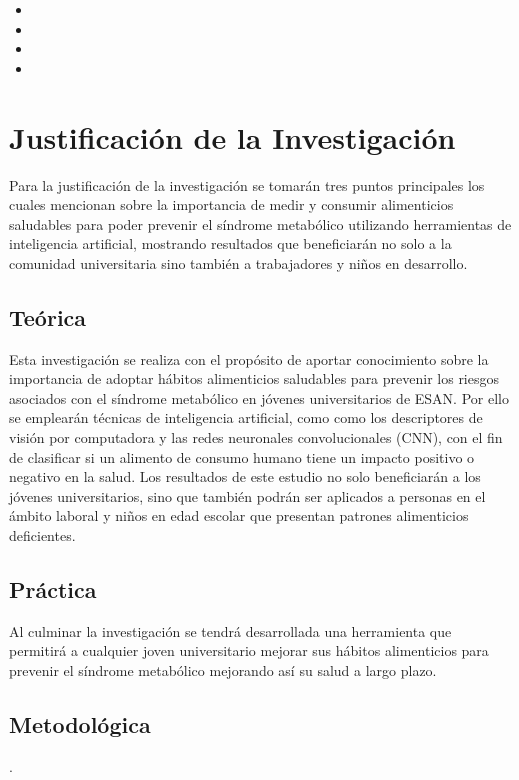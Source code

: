 \begin{itemize}
	\item \Hone
	\item \Htwo
	\item \Hthree
 	\item \Hfour
\end{itemize}

\section{Justificación de la Investigación}

Para la justificación de la investigación se tomarán tres puntos principales los cuales mencionan sobre la importancia de medir y consumir alimenticios saludables para poder prevenir el síndrome metabólico utilizando herramientas de inteligencia artificial, mostrando resultados que beneficiarán no solo a la comunidad universitaria sino también a trabajadores y niños en desarrollo.

\subsection{Teórica}

Esta investigación se realiza con el propósito de aportar conocimiento sobre la importancia de adoptar hábitos alimenticios saludables para prevenir los riesgos asociados con el síndrome metabólico en jóvenes universitarios de ESAN. Por ello se emplearán técnicas de inteligencia artificial, como como los descriptores de visión por computadora y las redes neuronales convolucionales (CNN), con el fin de clasificar si un alimento de consumo humano tiene un impacto positivo o negativo en la salud. Los resultados de este estudio no solo beneficiarán a los jóvenes universitarios, sino que también podrán ser aplicados a personas en el ámbito laboral y niños en edad escolar que presentan patrones alimenticios deficientes.

\subsection{Práctica}

Al culminar la investigación se tendrá desarrollada una herramienta que permitirá a cualquier joven universitario mejorar sus hábitos alimenticios para prevenir el síndrome metabólico mejorando así su salud a largo plazo.

\subsection{Metodológica}. 

